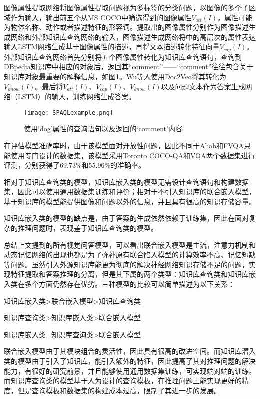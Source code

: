 图像属性提取网络将图像属性提取问题视为多标签的分类问题，以图像的多个子区域作为输入，输出前五个从MS COCO中筛选得到的图像属性$V_{att}(I)$，属性可能为物体名称、动作或者描述特征的形容词。提取出的图像属性分别作为图像描述生成网络和外部知识库查询网络的输入，图像描述生成网络将\cite{wu2016value}中的高层次的属性表达输入LSTM网络生成基于图像属性的描述，再将文本描述转化特征向量$V_{cap}(I)$。外部知识库查询网络首先分别将五个图像属性转化为知识库查询语句，查询到DBpedia知识库中相应的对象后，返回其“comment”——“comment”往往包含关于知识库对象最重要的解释信息，如图\ref{SPAQLexample}。Wu等人使用Doc2Vec将其转化为$V_{know}(I)$。最后将$V_{att}(I)$、$V_{cap}(I)$、$V_{know}(I)$以及问题文本作为答案生成网络（LSTM）的输入，训练网络生成答案。
\begin{figure}[H]
	\centering
	\texttt{[image: SPAQLexample.png]}
	\caption{使用‘dog’属性的查询语句以及返回的‘comment’内容}
	\label{SPAQLexample}
\end{figure}

在评估模型准确率时，由于该模型面对开放性问题，因此不同于Ahab和FVQA只能使用专门设计的数据集，该模型采用Toronto COCO-QA和VQA两个数据集进行评测，分别获得了69.73\%和55.96\%的准确率。

相对于知识库查询类的模型，知识库嵌入类的模型无需设计查询语句和构建数据集，因此可以使用通用数据集训练和评价；相对于不引入知识库的联合嵌入模型，基于知识库的模型能提供图像和问题以外的信息，并且具有很高的知识存储容量。

知识库嵌入类的模型的缺点是，由于答案的生成依然依赖于训练集，因此在面对复杂的推理问题时，表现差于知识库查询类的模型。

总结上文提到的所有视觉问答模型，可以看出联合嵌入模型是主流，注意力机制和动态记忆网络的出现也都是为了弥补原有联合陷入模型的计算效率不高、记忆短缺等问题。虽然引入外源知识库能更为彻底的解决神经网络知识存储不足的问题，实现特征提取和答案推理的分离，但是其下属的两个类型：知识库查询类和知识库嵌入类在多个方面仍然存在优劣。三种模型的比较可以简单描述为以下关系：
\begin{description}[labelindent=2em, leftmargin=6em, style=sameline]
\item [解决识别类问题：]知识库嵌入类>联合嵌入模型>知识库查询类
\item [解决推理类问题：]知识库查询类>知识库嵌入类>联合嵌入模型
\item [模型迁移能力：]知识库嵌入类=知识库查询类>联合嵌入模型
\end{description}

联合嵌入模型由于其模块组合的灵活性，因此具有很高的改进空间。而知识库潜入类的模型由于引入了知识库，能引入额外的特征，因此提高了其对推理问题的解决能力，有很好的研究前景，并且能够使用通用数据集训练，可实现端对端的训练。而知识库查询类的模型基于人为设计的查询模板，在推理问题上能实现更好的精度，但是查询模板和数据集的构建成本过高，限制了其进一步的发展。

